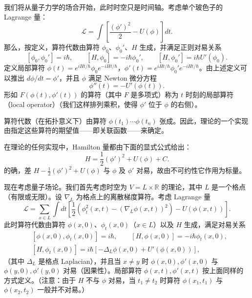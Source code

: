 我们将从量子力学的场合开始，此时时空只是时间轴。考虑单个玻色子的 Lagrange 量：
\[
\mathcal{L}=\int\left[\frac{(\phi')^2}{2}-U(\phi)\right]dt.
\]
那么，按定义，算符代数由算符 $\phi_0$、$\phi_0'$、$H$ 生成，并满足正则对易关系
\[
[\phi_0,\phi_0']=i\hbar,\qquad [H,\phi_0]=-i\hbar\phi_0',\qquad [H,\phi_0']=i\hbar U'(\phi_0).
\]
定义局部算符 $\phi(t)=e^{iHt/\hbar}\phi_0e^{-iHt/\hbar}$，$\phi'(t)=e^{iHt/\hbar}\phi_0'e^{-iHt/\hbar}$。由上述定义可以推出 $d\phi/dt=\phi'$，并且 $\phi$ 满足 Newton 微分方程
\[
\phi''(t)=-U'(\phi(t)).
\]
形如 $F(\phi(t),\phi'(t))$ 的算符（其中 $F$ 是多项式）称为 $t$ 时刻的局部算符（local operator）（我们这样排列乘积，使得 $\phi'$ 位于 $\phi$ 的右侧）。

算符代数（在拓扑意义下）由算符 $\phi(t_1)\cdots\phi(t_n)$ 张成。因此，理论的一个实现由指定这些算符的期望值——即关联函数——来确定。

在理论的任何实现中，Hamilton 量都由下面的显式公式给出：
\[
H=\frac12(\phi')^2+U(\phi)+C.
\]
的确，差 $H-\frac12(\phi')^2+U(\phi)$ 与 $\phi$ 及 $\phi'$ 对易，故由不可约性它作用为标量。



现在考虑量子场论。我们首先考虑时空为 $V=L\times\mathbb{R}$ 的理论，其中 $L$ 是一个格点（有限或无限）。设 $\nabla_L$ 为格点上的离散梯度算符。考虑 Lagrange 量
\[
\mathcal{L}=\sum_{x\in L}\int dt\left[\frac12\left(\phi_t^2(x,t)-(\nabla_L\phi(x,t))^2\right)-U(\phi(x,t))\right].
\]
此时算符代数由算符 $\phi(x,0)$、$\phi_t(x,0)$（$x\in L$）以及 $H$ 生成，满足对易关系
\[
\begin{aligned}
&[\phi(x,0),\phi_t(x,0)]=i\hbar,\qquad [H,\phi(x,0)]=-i\hbar\phi_t(x,0),\\
&[H,\phi_t(x,0)]=i\hbar\left[-\Delta_L\phi(x,0)+U'(\phi(x,0))\right],
\end{aligned}
\]
（其中 $\Delta_L$ 是格点 Laplacian），并且当 $x\neq y$ 时 $\phi(x,0),\phi'(x,0)$ 与 $\phi(y,0),\phi'(y,0)$ 对易（因果性）。局部算符 $\phi(x,t),\phi'(x,t)$ 按上面同样的方式定义。（注意：由于 $H$ 不与 $\phi$ 对易，当 $t_1\neq t_2$ 时算符 $\phi(x_1,t_1)$ 与 $\phi(x_2,t_2)$ 一般并不对易。）

